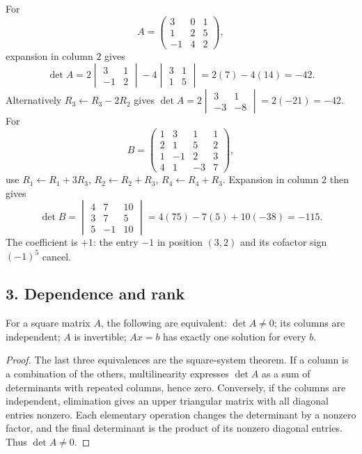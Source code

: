 \begin{example}
For
\[
 A=\begin{pmatrix}3&0&1\\1&2&5\\-1&4&2\end{pmatrix},
\]
expansion in column \(2\) gives
\[
 \det A=2\begin{vmatrix}3&1\\-1&2\end{vmatrix}
       -4\begin{vmatrix}3&1\\1&5\end{vmatrix}
       =2(7)-4(14)=-42.
\]
Alternatively \(R_3\leftarrow R_3-2R_2\) gives
\(\det A=2\begin{vmatrix}3&1\\-3&-8\end{vmatrix}=2(-21)=-42\).
For
\[
 B=\begin{pmatrix}1&3&1&1\\2&1&5&2\\1&-1&2&3\\4&1&-3&7\end{pmatrix},
\]
use \(R_1\leftarrow R_1+3R_3\), \(R_2\leftarrow R_2+R_3\),
\(R_4\leftarrow R_4+R_3\). Expansion in column \(2\) then gives
\[
 \det B=\begin{vmatrix}4&7&10\\3&7&5\\5&-1&10\end{vmatrix}
 =4(75)-7(5)+10(-38)=-115.
\]
The coefficient is \(+1\): the entry \(-1\) in position \((3,2)\) and its
cofactor sign \((-1)^5\) cancel.
\end{example}

\subsection*{3. Dependence and rank}
\begin{theorem}\label{thm:07:nonsingular}
For a square matrix \(A\), the following are equivalent:
\(\det A\ne0\); its columns are independent; \(A\) is invertible;
\(Ax=b\) has exactly one solution for every \(b\).
\end{theorem}
\begin{proof}
The last three equivalences are the square-system theorem.
If a column is a combination of the others, multilinearity expresses
\(\det A\) as a sum of determinants with repeated columns, hence zero.
Conversely, if the columns are independent, elimination gives an upper
triangular matrix with all diagonal entries nonzero. Each elementary
operation changes the determinant by a nonzero factor, and the final
determinant is the product of its nonzero diagonal entries. Thus
\(\det A\ne0\).
\end{proof}

